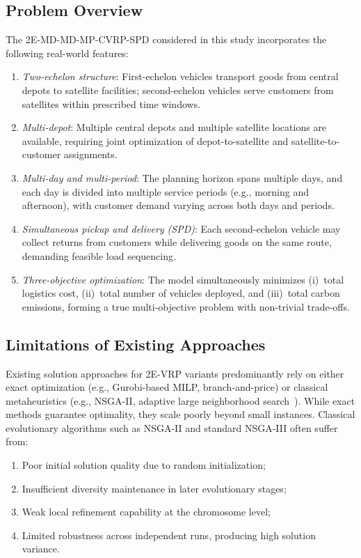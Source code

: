\documentclass[11pt, a4paper]{article}
\numberwithin{equation}{section}
\begin{document}
\subsection{Problem Overview}

The 2E-MD-MD-MP-CVRP-SPD considered in this study incorporates the following
real-world features:
\begin{enumerate}
  \item \textit{Two-echelon structure}: First-echelon vehicles transport goods
        from central depots to satellite facilities; second-echelon vehicles
        serve customers from satellites within prescribed time windows.
  \item \textit{Multi-depot}: Multiple central depots and multiple satellite
        locations are available, requiring joint optimization of depot-to-satellite
        and satellite-to-customer assignments.
  \item \textit{Multi-day and multi-period}: The planning horizon spans multiple
        days, and each day is divided into multiple service periods
        (e.g., morning and afternoon), with customer demand varying across both
        days and periods.
  \item \textit{Simultaneous pickup and delivery (SPD)}: Each second-echelon
        vehicle may collect returns from customers while delivering goods on the
        same route, demanding feasible load sequencing.
  \item \textit{Three-objective optimization}: The model simultaneously minimizes
        (i)~total logistics cost, (ii)~total number of vehicles deployed,
        and (iii)~total carbon emissions, forming a true multi-objective problem
        with non-trivial trade-offs.
\end{enumerate}

\subsection{Limitations of Existing Approaches}

Existing solution approaches for 2E-VRP variants predominantly rely on either
exact optimization (e.g., Gurobi-based MILP, branch-and-price) or classical
metaheuristics (e.g., NSGA-II, adaptive large neighborhood search~\cite{ropke2006}).  While
exact methods guarantee optimality, they scale poorly beyond small instances.
Classical evolutionary algorithms such as NSGA-II and standard NSGA-III often
suffer from:
\begin{enumerate}[label=(\roman*)]
  \item Poor initial solution quality due to random initialization;
  \item Insufficient diversity maintenance in later evolutionary stages;
  \item Weak local refinement capability at the chromosome level;
  \item Limited robustness across independent runs, producing high solution
        variance.
\end{enumerate}
\end{document}
